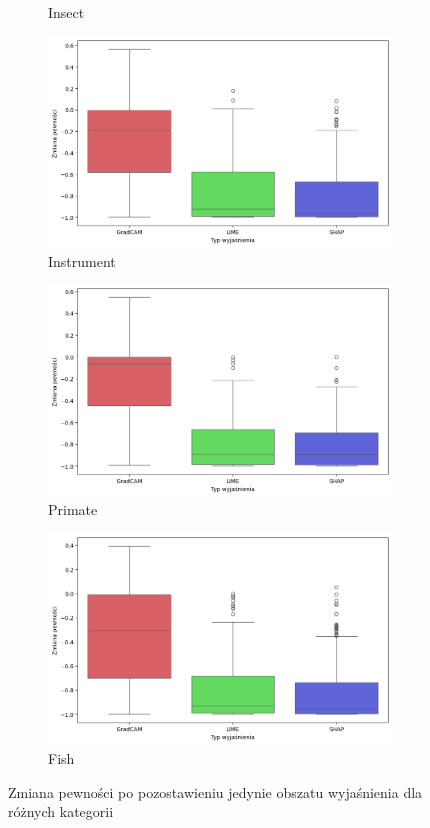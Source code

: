 \begin{figure}[h]
\begin{subfigure}[b]{0.3\textwidth}
		\caption{Insect}  \label{rys:base_confidence_exp_insect}
	\end{subfigure}
	\begin{subfigure}[b]{0.3\textwidth}
		\centering\includegraphics[width=.9\textwidth]{img/base_confidence_exp_music}
		\caption{Instrument}  \label{rys:base_confidence_exp_music}
	\end{subfigure}
	\begin{subfigure}[b]{0.3\textwidth}
		\centering\includegraphics[width=.9\textwidth]{img/base_confidence_exp_primate}
		\caption{Primate}  \label{rys:base_confidence_exp_primate}
	\end{subfigure}
	\begin{subfigure}[b]{0.3\textwidth}
		\centering\includegraphics[width=.9\textwidth]{img/base_confidence_exp_fish}
		\caption{Fish}  \label{rys:base_confidence_exp_fish}
	\end{subfigure}
	\caption{Zmiana pewności po pozostawieniu jedynie obszatu wyjaśnienia dla różnych kategorii}
	\label{rys:base_confidence_exp_category}
\end{figure}

